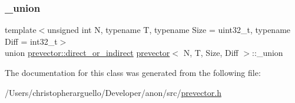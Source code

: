 \mbox{\label{classprevector_a63f4581aed8f75e5b18e985d368b0ac0}} 
\subsubsection{\texorpdfstring{\+\_\+union}{\_union}}
{\footnotesize\ttfamily template$<$unsigned int N, typename T, typename Size = uint32\+\_\+t, typename Diff = int32\+\_\+t$>$ \\
union \mbox{\hyperlink{unionprevector_1_1direct__or__indirect}{prevector\+::direct\+\_\+or\+\_\+indirect}}  \mbox{\hyperlink{classprevector}{prevector}}$<$ N, T, Size, Diff $>$\+::\+\_\+union\hspace{0.3cm}{\ttfamily [private]}}



The documentation for this class was generated from the following file\+:\begin{DoxyCompactItemize}
\item 
/\+Users/christopherarguello/\+Developer/anon/src/\mbox{\hyperlink{prevector_8h}{prevector.\+h}}\end{DoxyCompactItemize}
